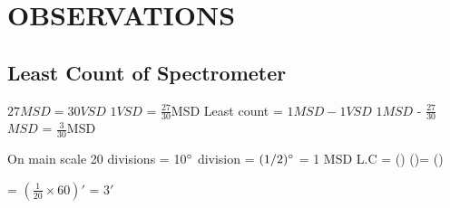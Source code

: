 \documentclass{article}
\begin{document}
\section{\LARGE OBSERVATIONS}
\subsection{\Large Least Count of Spectrometer} 

$27 MSD = 30 VSD$
\vspace*{\baselineskip}
\newline
 $1 VSD$ = $\frac{27}{30}$MSD
 \vspace*{\baselineskip}
\newline
Least count = $1 MSD - 1 VSD$
\vspace*{\baselineskip}
\newline
$1 MSD$ - $\frac{27}{30}$$MSD$ = $\frac{3}{30}$MSD
\vspace*{\baselineskip}

\newline
\vspace*{\baselineskip}
On main scale 20 divisions = 10$\degree$
\vspace*{\baselineskip}
 division = $(1/2)\degree$ = 1 MSD
\vspace*{\baselineskip}
\newline 
\therefore L.C = () \times ()\degree = ()\degree
\vspace*{\baselineskip}
\newline


= $(\frac{1}{20} \times 60)'$ = $3'$
\end{document}

